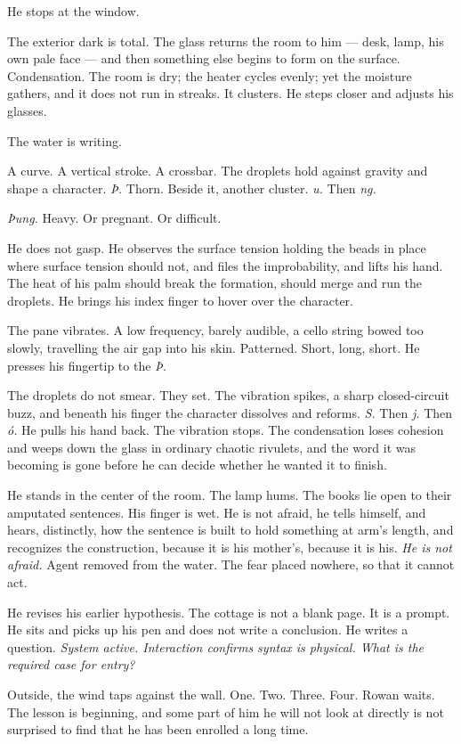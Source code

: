\documentclass[11pt,oneside]{book}
\begin{document}
He stops at the window.

The exterior dark is total. The glass returns the room to him --- desk,
lamp, his own pale face --- and then something else begins to form on
the surface. Condensation. The room is dry; the heater cycles evenly;
yet the moisture gathers, and it does not run in streaks. It clusters.
He steps closer and adjusts his glasses.

The water is writing.

A curve. A vertical stroke. A crossbar. The droplets hold against
gravity and shape a character. \emph{Þ.} Thorn. Beside it, another
cluster. \emph{u.} Then \emph{ng.}

\emph{Þung.} Heavy. Or pregnant. Or difficult.

He does not gasp. He observes the surface tension holding the beads in
place where surface tension should not, and files the improbability, and
lifts his hand. The heat of his palm should break the formation, should
merge and run the droplets. He brings his index finger to hover over the
character.

The pane vibrates. A low frequency, barely audible, a cello string bowed
too slowly, travelling the air gap into his skin. Patterned. Short,
long, short. He presses his fingertip to the \emph{Þ.}

The droplets do not smear. They set. The vibration spikes, a sharp
closed-circuit buzz, and beneath his finger the character dissolves and
reforms. \emph{S.} Then \emph{j.} Then \emph{ó.} He pulls his hand back.
The vibration stops. The condensation loses cohesion and weeps down the
glass in ordinary chaotic rivulets, and the word it was becoming is gone
before he can decide whether he wanted it to finish.

He stands in the center of the room. The lamp hums. The books lie open
to their amputated sentences. His finger is wet. He is not afraid, he
tells himself, and hears, distinctly, how the sentence is built to hold
something at arm's length, and recognizes the construction, because it
is his mother's, because it is his. \emph{He is not afraid.} Agent
removed from the water. The fear placed nowhere, so that it cannot act.

He revises his earlier hypothesis. The cottage is not a blank page. It
is a prompt. He sits and picks up his pen and does not write a
conclusion. He writes a question. \emph{System active. Interaction
confirms syntax is physical. What is the required case for entry?}

Outside, the wind taps against the wall. One. Two. Three. Four. Rowan
waits. The lesson is beginning, and some part of him he will not look at
directly is not surprised to find that he has been enrolled a long time.
\end{document}
